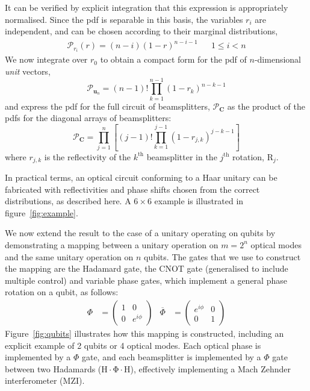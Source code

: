 \documentclass[aps,prl,twocolumn,floatfix]{revtex4}
\renewcommand{\vec}[1]{\mathbf{#1}}
\newcommand{\mat}[1]{\mathrm{#1}}
\newcommand{\by}{\times}
\newcommand{\of}[1]{\!\left(#1\right)}
\newcommand{\pdf}{{pdf}}
\newcommand{\prob}[1]{\mathcal{#1}}
\begin{document}
It can be verified by explicit integration that this expression is appropriately
normalised. Since the \pdf{} is separable in this basis, the variables \( r_i
\) are independent, and can be chosen according to their marginal distributions,
\begin{align}
  \prob{P}_{r_{i}} \of{r} = \left( n-i \right) \left( 1-r \right)^{n-i-1} &&
  1 \leq i < n
\end{align}
We now integrate over \(r_{0}\) to obtain a compact form for the \pdf{} of
\(n\)-dimensional \emph{unit} vectors,
\begin{equation}
  \prob{P}_{ \vec{u}_n } = \left( n-1 \right)! \prod_{k=1}^{n-1} \left( 1-r_k
  \right)^{n-k-1}
\end{equation}
and express the \pdf{} for the full circuit of beamsplitters,
\(\prob{P}_{\vec{C}}\) as the product of the \pdf{}s for the diagonal arrays of
beamsplitters:
\begin{equation}
  \prob{P}_{\vec{C}} = \prod_{j=1}^{n} \left[ \left( j-1 \right)!
  \prod_{k=1}^{j-1} \left( 1-r_{j,k} \right)^{j-k-1} \right]
\end{equation}
where \( r_{j,k} \) is the reflectivity of the \( k^{\text{th}} \) beamsplitter
in the \( j^{\text{th}} \) rotation, \( \mat{R}_j \).

In practical terms, an optical circuit conforming to a Haar unitary can be
fabricated with reflectivities and phase shifts chosen from the correct
distributions, as described here. A \( 6 \by 6 \) example is illustrated in
figure~\ref{fig:example}.

We now extend the result to the case of a unitary operating on qubits by
demonstrating a mapping between a unitary operation on \(m=2^{n}\) optical
modes and the same unitary operation on \(n\) qubits. The gates that we use to
construct the mapping are the Hadamard gate, the CNOT gate (generalised to
include multiple control) and variable phase gates, which implement a general
phase rotation on a qubit, as follows:
\begin{align}
  \Phi &= \begin{pmatrix}
    1 & 0 \\
    0 & e^{i\phi}
  \end{pmatrix} &
  \overline{\Phi} &= \begin{pmatrix}
    e^{i\phi} & 0 \\
    0 & 1
  \end{pmatrix}
\end{align}
Figure~\ref{fig:qubits} illustrates how this mapping is constructed, including
an explicit example of 2 qubits or 4 optical modes. Each optical phase is
implemented by a \(\Phi\) gate, and each beamsplitter is implemented by a
\(\Phi\) gate between two Hadamards (\(\mathrm{H \cdot \Phi \cdot H}\)),
effectively implementing a Mach Zehnder interferometer (MZI).
\end{document}
